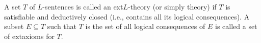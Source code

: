 A set $T$ of $L$-sentences is called an 	ext{$L$-theory} (or simply theory) if $T$ is satisfiable and deductively closed (i.e., contains all its logical consequences). A subset $E \subseteq T$ such that $T$ is the set of all logical consequences of $E$ is called a set of 	ext{axioms} for $T$.
